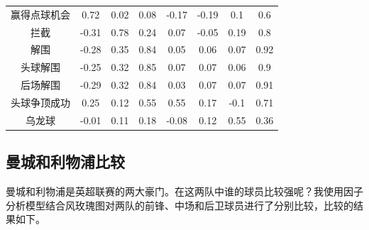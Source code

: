 \documentclass[12pt,a4paper,onecolumn]{article}
\begin{document}
\begin{table}[H]
\begin{tabular}{cccccccc}
		赢得点球机会 & 0.72 & 0.02 & 0.08 & -0.17 & -0.19 & 0.1 & 0.6 \\
		拦截 & -0.31 & 0.78 & 0.24 & 0.07 & -0.05 & 0.19 & 0.8 \\
		解围 & -0.28 & 0.35 & 0.84 & 0.05 & 0.06 & 0.07 & 0.92 \\
		头球解围 & -0.25 & 0.32 & 0.85 & 0.07 & 0.07 & 0.06 & 0.9 \\
		后场解围 & -0.29 & 0.32 & 0.84 & 0.03 & 0.07 & 0.07 & 0.91 \\
		头球争顶成功 & 0.25 & 0.12 & 0.55 & 0.55 & 0.17 & -0.1 & 0.71 \\
		乌龙球 & -0.01 & 0.11 & 0.18 & -0.08 & 0.12 & 0.55 & 0.36 \\
    \hline
  \end{tabular}
\end{table}

\subsection{曼城和利物浦比较}

曼城和利物浦是英超联赛的两大豪门。在这两队中谁的球员比较强呢？我使用因子分析模型结合风玫瑰图对两队的前锋、中场和后卫球员进行了分别比较，比较的结果如下。
\end{document}
